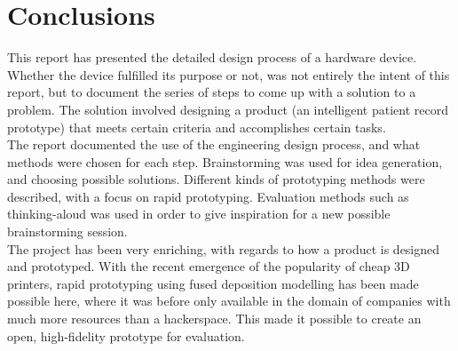 \clearpage

\section{Conclusions}

This report has presented the detailed design process of a hardware device. Whether the device fulfilled its purpose or not, was not entirely the intent of this report, but to document the series of steps to come up with a solution to a problem. The solution involved designing a product (an intelligent patient record prototype) that meets certain criteria and accomplishes certain tasks. \\

The report documented the use of the engineering design process, and what methods were chosen for each step. Brainstorming was used for idea generation, and choosing possible solutions. Different kinds of prototyping methods were described, with a focus on rapid prototyping. Evaluation methods such as thinking-aloud was used in order to give inspiration for a new possible brainstorming session. \\

The project has been very enriching, with regards to how a product is designed and prototyped. With the recent emergence of the popularity of cheap 3D printers, rapid prototyping using fused deposition modelling has been made possible here, where it was before only available in the domain of companies with much more resources than a hackerspace. This made it possible to create an open, high-fidelity prototype for evaluation.
 